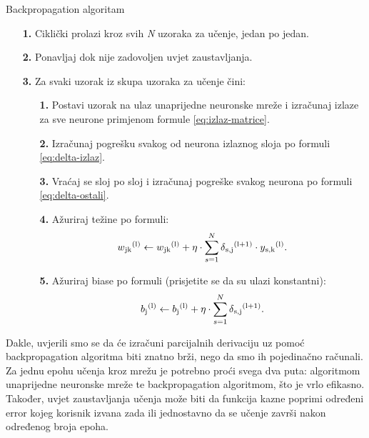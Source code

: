 \documentclass[times, utf8, zavrsni]{fer}
\begin{document}
\begin{algorithm}
\caption{Backpropagation algoritam\footnotemark}
\label{algo:alg-backprop}
    \begin{enumerate}
        \item[\textbf{1.}] Ciklički prolazi kroz svih \textit{N} uzoraka za učenje, jedan po jedan.
        \item[\textbf{2.}] Ponavljaj dok nije zadovoljen uvjet zaustavljanja.
        \item[\textbf{3.}] Za svaki uzorak iz skupa uzoraka za učenje čini:
        \begin{enumerate}
            \item[\textbf{1.}] Postavi uzorak na ulaz unaprijedne neuronske mreže i izračunaj izlaze za sve neurone primjenom formule \eqref{eq:izlaz-matrice}.
            \item[\textbf{2.}] Izračunaj pogrešku svakog od neurona izlaznog sloja po formuli \eqref{eq:delta-izlaz}.
            \item[\textbf{3.}] Vraćaj se sloj po sloj i izračunaj pogreške svakog neurona po formuli \eqref{eq:delta-ostali}.
            \item[\textbf{4.}] Ažuriraj težine po formuli:
                \begin{equation}
                    \label{eq:azuriranje}
                    w\textsubscript{jk}\textsuperscript{(l)} \leftarrow w\textsubscript{jk}\textsuperscript{(l)} + \eta\cdot\sum\limits_{s=1}^N \delta\textsubscript{s,j}\textsuperscript{(l+1)} \cdot y\textsubscript{s,k}\textsuperscript{(l)}.
                \end{equation}
            \item[\textbf{5.}] Ažuriraj biase po formuli (prisjetite se da su ulazi konstantni):
                \begin{equation}
                    \label{eq:azuriranje-bias}
                    b\textsubscript{j}\textsuperscript{(l)} \leftarrow b\textsubscript{j}\textsuperscript{(l)} + \eta\cdot\sum\limits_{s=1}^N \delta\textsubscript{s,j}\textsuperscript{(l+1)}.
                \end{equation}
        \end{enumerate}
    \end{enumerate}
\end{algorithm}

\newpage
Dakle, uvjerili smo se da će izračuni parcijalnih derivaciju uz pomoć backpropagation algoritma biti znatno brži, nego da smo ih pojedinačno računali. Za jednu epohu učenja kroz mrežu je potrebno proći svega dva puta: algoritmom unaprijedne neuronske mreže te backpropagation algoritmom, što je vrlo efikasno. Također, uvjet zaustavljanja učenja može biti da funkcija kazne poprimi određeni error kojeg korisnik izvana zada ili jednostavno da se učenje završi nakon određenog broja epoha.
\end{document}
